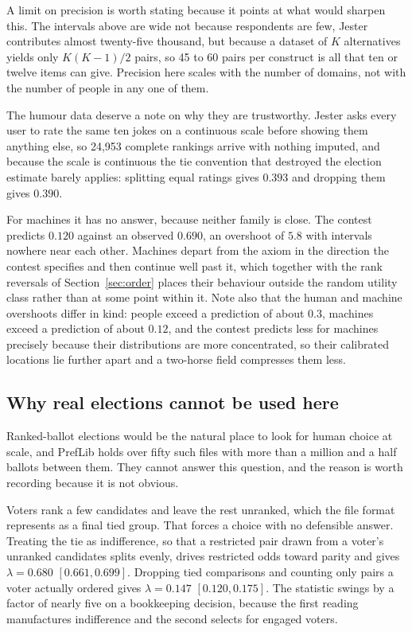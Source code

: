 \documentclass[11pt]{article}
\begin{document}
A limit on precision is worth stating because it points at what would sharpen
this. The intervals above are wide not because respondents are few, Jester
contributes almost twenty-five thousand, but because a dataset of $K$
alternatives yields only $K(K-1)/2$ pairs, so 45 to 60 pairs per construct is
all that ten or twelve items can give. Precision here scales with the number of
domains, not with the number of people in any one of them.

The humour data deserve a note on why they are trustworthy. Jester asks every
user to rate the same ten jokes on a continuous scale before showing them
anything else, so 24{,}953 complete rankings arrive with nothing imputed, and
because the scale is continuous the tie convention that destroyed the election
estimate barely applies: splitting equal ratings gives $0.393$ and dropping them
gives $0.390$.

For machines it has no answer, because neither family is close. The contest
predicts $0.120$ against an observed $0.690$, an overshoot of $5.8$ with
intervals nowhere near each other. Machines depart from the axiom in the
direction the contest specifies and then continue well past it, which together
with the rank reversals of Section~\ref{sec:order} places their behaviour
outside the random utility class rather than at some point within it. Note also
that the human and machine overshoots differ in kind: people exceed a
prediction of about $0.3$, machines exceed a prediction of about $0.12$, and the
contest predicts less for machines precisely because their distributions are more
concentrated, so their calibrated locations lie further apart and a two-horse
field compresses them less.

\subsection{Why real elections cannot be used here}

Ranked-ballot elections would be the natural place to look for human choice at
scale, and PrefLib holds over fifty such files with more than a million and a half
ballots between them. They cannot answer this question, and the reason is worth
recording because it is not obvious.

Voters rank a few candidates and leave the rest unranked, which the file format
represents as a final tied group. That forces a choice with no defensible answer.
Treating the tie as indifference, so that a restricted pair drawn from a voter's
unranked candidates splits evenly, drives restricted odds toward parity and gives
$\lambda = 0.680$ $[0.661, 0.699]$. Dropping tied comparisons and counting only
pairs a voter actually ordered gives $\lambda = 0.147$ $[0.120, 0.175]$. The
statistic swings by a factor of nearly five on a bookkeeping decision, because
the first reading manufactures indifference and the second selects for engaged
voters.
\end{document}

